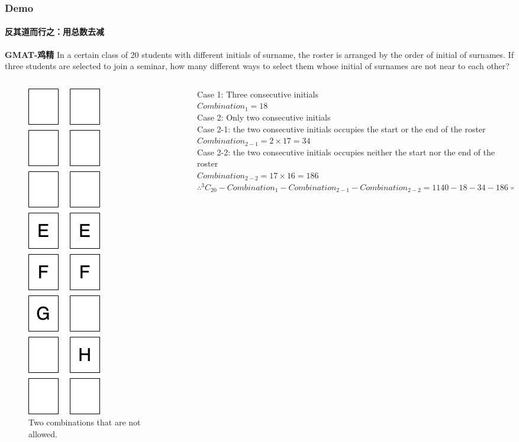 \documentclass[
	11pt, %
	handout,
]{beamer}
\begin{document}
\begin{frame}
	\frametitle{Demo}
	\framesubtitle{反其道而行之：用总数去减}
\textbf{GMAT-鸡精} In a certain class of 20 students with different initials of surname, the roster is arranged by the order of initial of surnames. If three students are selected to join a
seminar, how many different ways to select them whose initial of surnames are not
near to each other?
	\begin{columns}[t] 
		\begin{column}{0.3\textwidth} %
				\begin{figure}
				\includegraphics[width=0.2\linewidth]{Surnames.png}
				\caption{Two combinations that are not allowed.}
				\end{figure}		
		\end{column}
		\begin{column}{0.7\textwidth} %
		Case 1: Three consecutive initials\\
		$Combination_1 = 18$\\
		\bigskip
		Case 2: Only two consecutive initials \\
		Case 2-1: the two consecutive initials occupies the start or the end of the roster\\
		$Combination_{2-1} = 2 \times 17 = 34$\\
		Case 2-2: the two consecutive initials occupies neither the start nor the end of the roster\\
		$Combination_{2-2} = 17 \times 16 = 186$\\
		$\therefore ^3C_{20} - Combination_1 -Combination_{2-1} - Combination_{2-2} = 1140 - 18 - 34 - 186 = \textbf{902}$
		\end{column}
	\end{columns}
\end{frame}
\end{document}
